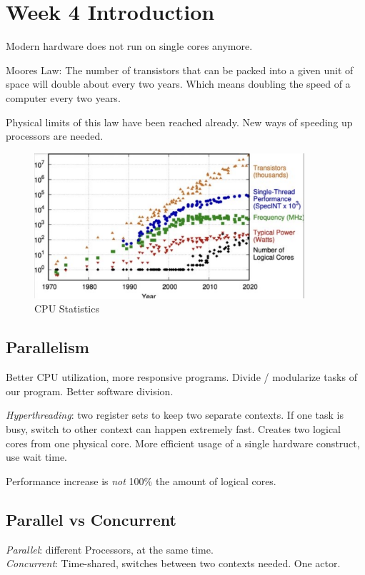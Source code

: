 \section{Week 4 Introduction}

Modern hardware does not run on single cores anymore.

Moores Law: The number of transistors that can be packed into a given unit of space will double about every two years. Which means doubling the speed of a computer every two years.

Physical limits of this law have been reached already. New ways of speeding up processors are needed.

\begin{figure}
    \centering
    \includegraphics*[width=10cm]{res/01-stats.png}
    \caption{CPU Statistics}
\end{figure}

\subsection{Parallelism}
Better CPU utilization, more responsive programs. Divide / modularize tasks of our program. Better software division.

\emph{Hyperthreading}: two register sets to keep two separate contexts. If one task is busy, switch to other context can happen extremely fast. Creates two logical cores from one physical core. More efficient usage of a single hardware construct, use wait time.

Performance increase is \emph{not} 100\% the amount of logical cores.

\subsection{Parallel vs Concurrent}
\emph{Parallel}: different Processors, at the same time. \\
\emph{Concurrent}: Time-shared, switches between two contexts needed. One actor.

